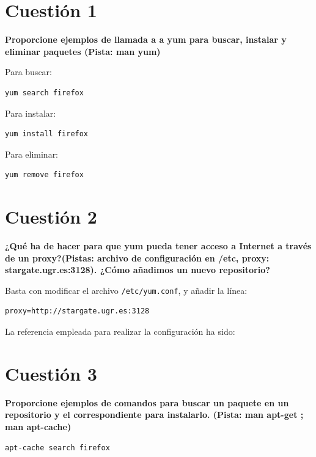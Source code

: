 \documentclass[a4paper,11pt]{article}
\newenvironment{answer}{%
\begin{list}{}{%
}%
\item[]}{\end{list}}
\newcommand{\imagent}[4]{
  \begin{figure}
    \begin{center}
    \texttt{[image: \#1]}
    \end{center}
    \caption{#3}
    \label{#4}
  \end{figure}
}
\newcommand{\imagen}[4]{
  \begin{minipage}{\linewidth}
    \centering
    \texttt{[image: \#1]}
    \captionof{figure}{#2}
    \label{#3}
  \end{minipage} 
}
\begin{document}
\newpage
\tableofcontents
\newpage

\section{Cuestión 1}
\textbf{Proporcione ejemplos de llamada a a yum para buscar, instalar y eliminar paquetes (Pista: man yum)}
\begin{answer}
  Para buscar:
  \begin{lstlisting}[style=BashInputStyle]
  yum search firefox
  \end{lstlisting}
  Para instalar:
  \begin{lstlisting}[style=BashInputStyle]
  yum install firefox
  \end{lstlisting}
  Para eliminar:
  \begin{lstlisting}[style=BashInputStyle]
  yum remove firefox
  \end{lstlisting}
\end{answer}

\section{Cuestión 2}
\textbf{¿Qué ha de hacer para que yum pueda tener acceso a Internet a través de un proxy?(Pistas: archivo de configuración
en /etc, proxy: stargate.ugr.es:3128). ¿Cómo añadimos un nuevo repositorio?}
\begin{answer}
  Basta con modificar el archivo \texttt{/etc/yum.conf}, y añadir la línea:
  \begin{lstlisting}[style=BashInputStyle]
  proxy=http://stargate.ugr.es:3128
  \end{lstlisting}
  
  La referencia empleada para realizar la configuración ha sido: \cite{ej2}
\end{answer}

\section{Cuestión 3}
\textbf{Proporcione ejemplos de comandos para buscar un paquete en un repositorio y el correspondiente para instalarlo. 
(Pista: man apt-get ; man apt-cache)}
\begin{answer}
  \begin{lstlisting}[style=BashInputStyle]
  apt-cache search firefox
  \end{lstlisting}
\end{answer}
\end{document}
